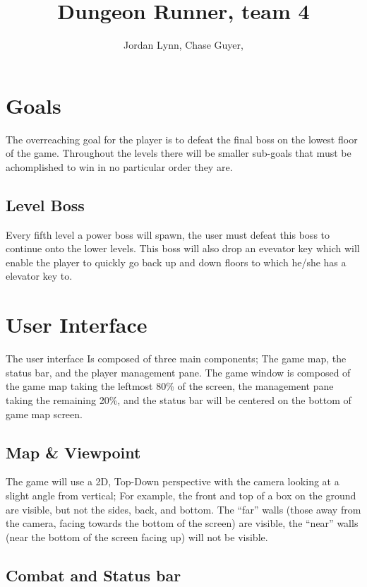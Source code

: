 \documentclass[11pt]{article}
\title{Dungeon Runner, team 4}
\author{Jordan Lynn, Chase Guyer, }
\begin{document}
    \maketitle

    \section{Goals}
    The overreaching goal for the player is to defeat the final boss on the lowest floor of the game. Throughout the levels there will be smaller sub-goals that must be achomplished to win in no particular order they are.
        \subsection{Level Boss}
            Every fifth level a power boss will spawn, the user must defeat this boss to continue onto the lower levels. This boss will also drop an evevator key which will enable the player to quickly go back up and down floors to which he/she has a elevator key to.

    \section{}

    \section{User Interface}
        The user interface Is composed of three main components; The game map, the status bar, and the player management pane.
	The game window is composed of the game map taking the leftmost 80\% of the screen, the management pane taking the remaining 20\%, and the status bar will be centered on the bottom of game map screen.

	\subsection{Map \& Viewpoint}
	The game will use a 2D, Top-Down perspective with the camera looking at a slight angle from vertical; For example, the front and top of a box on the ground are visible, but not the sides, back, and bottom.
	The ``far'' walls (those away from the camera, facing towards the bottom of the screen) are visible, the ``near'' walls (near the bottom of the screen facing up) will not be visible.

	\subsection{Combat and Status bar}
\end{document}
